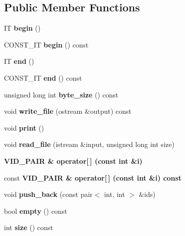 \subsection*{Public Member Functions}
\begin{CompactItemize}
\item 
IT \textbf{begin} ()\label{classevat_576e837271071e10535be5b0276c06c6}

\item 
CONST\_\-IT \textbf{begin} () const \label{classevat_aec6a953834c8df278e84d7d0a76e62d}

\item 
IT \textbf{end} ()\label{classevat_eb2eff3b7a1e3a340731d33ecb472ebf}

\item 
CONST\_\-IT \textbf{end} () const \label{classevat_53b5428fa4e1bc8a87393ec006a4881b}

\item 
unsigned long int \textbf{byte\_\-size} () const \label{classevat_6a3eedbcb81a62843d797f9b1e84019e}

\item 
void \textbf{write\_\-file} (ostream \&output) const \label{classevat_d6f516e7129ff18a346448fc59b76b68}

\item 
void \textbf{print} ()\label{classevat_7e1a9484cee6cc29558cc4473f44917a}

\item 
void \textbf{read\_\-file} (istream \&input, unsigned long int size)\label{classevat_69492f88605136b53ee482a3d8d93c1a}

\item 
\bf{VID\_\-PAIR} \& \textbf{operator[$\,$]} (const int \&i)\label{classevat_c64c086071cdc335b9a1323a49ad131b}

\item 
const \bf{VID\_\-PAIR} \& \textbf{operator[$\,$]} (const int \&i) const \label{classevat_9b74bb00a85e13c702e1f27fd4f43b47}

\item 
void \textbf{push\_\-back} (const pair$<$ int, int $>$ \&ids)\label{classevat_32a3e3ee1a1a23bd65e7b33b854de201}

\item 
bool \textbf{empty} () const \label{classevat_9299ee5a0adc8bf1f1f0a338574afe80}

\item 
int \textbf{size} () const \label{classevat_55b6a33806d6b1c7523a69d5a046bd66}

\end{CompactItemize}
